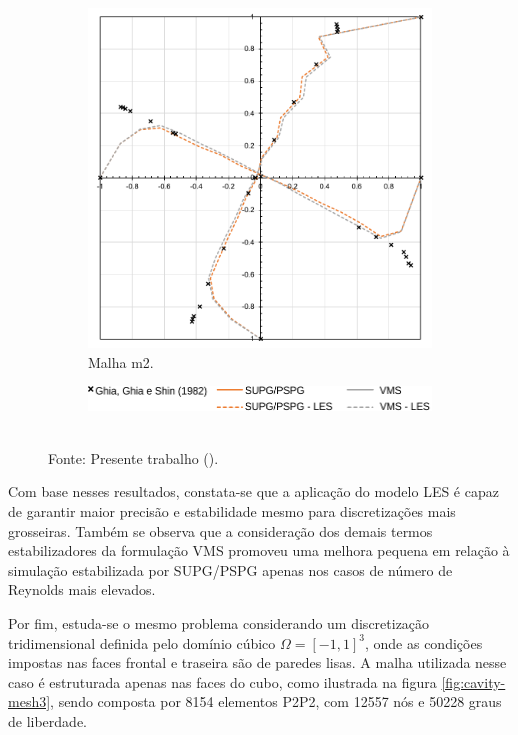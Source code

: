 \begin{figure}[h!]
\begin{subfigure}{0.49\textwidth}
        \includegraphics[width=\linewidth]{Figuras/Cavity/res-m2.pdf}
        \caption{Malha m2.}
    \end{subfigure}
    \begin{subfigure}{0.4\textwidth}
        \includegraphics[width=\linewidth]{Figuras/Cavity/legenda-m1m2.pdf}
    \end{subfigure}
    \\Fonte: Presente trabalho (\the\year).
    \label{fig:cavity-results3}
\end{figure}

Com base nesses resultados, constata-se que a aplicação do modelo LES é capaz de garantir maior precisão e estabilidade mesmo para discretizações mais grosseiras. Também se observa que a consideração dos demais termos estabilizadores da formulação VMS promoveu uma melhora pequena em relação à simulação estabilizada por SUPG/PSPG apenas nos casos de número de Reynolds mais elevados.

Por fim, estuda-se o mesmo problema considerando um discretização tridimensional definida pelo domínio cúbico $\Omega=[-1,1]^3$, onde as condições impostas nas faces frontal e traseira são de paredes lisas. A malha utilizada nesse caso é estruturada apenas nas faces do cubo, como ilustrada na figura \ref{fig:cavity-mesh3}, sendo composta por 8154 elementos P2P2, com 12557 nós e 50228 graus de liberdade.

